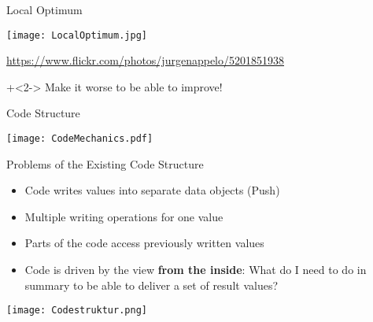\begin{frame}[fragile]{Local Optimum}

{
\begin{center}
\texttt{[image: LocalOptimum.jpg]}
\end{center}
\vspace{-1.7em}
\hfill \tiny{\url{https://www.flickr.com/photos/jurgenappelo/5201851938}}
}

\onslide+<2->
\vspace{2em}
Make it worse to be able to improve!

\end{frame}


\begin{frame}[fragile]{Code Structure}

\texttt{[image: CodeMechanics.pdf]}

\end{frame}

\begin{frame}[fragile]{Problems of the Existing Code Structure}
\begin{minipage}{.45\paperwidth}
\begin{itemize}
\item Code writes values into separate data objects (\glqq Push\grqq{})
\item Multiple writing operations for one value
\item Parts of  the code access previously written values
\item Code is driven by the view \textbf{from the inside}: What do I need to do in summary to be able to deliver a set of result values?
\end{itemize}
\end{minipage} \hfill
\begin{minipage}{.45\paperwidth}
\texttt{[image: Codestruktur.png]}
\end{minipage}

\end{frame}

